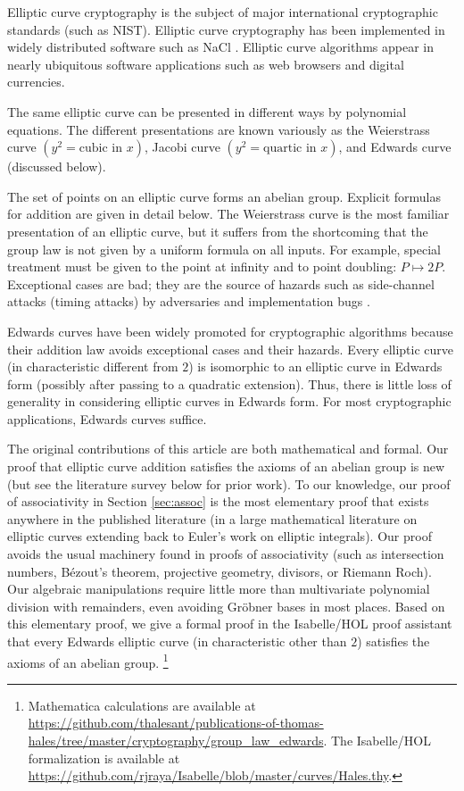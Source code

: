 \documentclass{llncs}
\begin{document}
Elliptic curve cryptography is the subject of major international
cryptographic standards (such as NIST).  Elliptic curve cryptography
has been implemented in widely distributed software such as NaCl
\cite{bernstein2012security}.  Elliptic curve algorithms appear in
nearly ubiquitous software applications such as web browsers and
digital currencies.

The same elliptic curve can be presented in different ways by
polynomial equations.  The different presentations are known variously
as the Weierstrass curve $(y^2 = \text{cubic in } x)$, Jacobi curve
$(y^2 = \text{quartic in } x)$, and Edwards curve (discussed below).

The set of points on an elliptic curve forms an abelian group.  Explicit
formulas for addition are given in detail below.  The Weierstrass
curve is the most familiar presentation of an elliptic curve, but it
suffers from the shortcoming that the group law is not given by a
uniform formula on all inputs.  For example, special treatment must be
given to the point at infinity and to point doubling: $P
\mapsto 2P$.  Exceptional cases are bad; they are the source of 
hazards such as side-channel attacks (timing attacks) by
adversaries and implementation bugs \cite{brier2002weierstrass}.

Edwards curves have been widely promoted for cryptographic algorithms
because their addition law avoids exceptional cases and their hazards.
Every elliptic curve (in characteristic different from $2$) is
isomorphic to an elliptic curve in Edwards form (possibly after
passing to a quadratic extension).  Thus, there is little loss of
generality in considering elliptic curves in Edwards form.  For most
cryptographic applications, Edwards curves suffice.

The original contributions of this article are both mathematical and
formal.  Our proof that elliptic curve addition satisfies the axioms
of an abelian group is new (but see the literature survey below for
prior work).  To our knowledge, our proof of
associativity in Section \ref{sec:assoc} is the most elementary proof
that exists anywhere in the published literature (in a large
mathematical literature on elliptic curves extending back to Euler's
work on elliptic integrals).  Our proof avoids the usual machinery
found in proofs of associativity (such as intersection numbers,
B\'ezout's theorem, projective geometry, divisors, or Riemann Roch).
Our algebraic manipulations require little more than multivariate
polynomial division with remainders, even avoiding Gr\"obner bases
in most places.
Based on this elementary proof, we give a formal proof in the
Isabelle/HOL proof assistant that every Edwards elliptic curve (in
characteristic other than $2$) satisfies the axioms of an abelian
group.%
%
\footnote{Mathematica calculations are available at\\
  \url{https://github.com/thalesant/publications-of-thomas-hales/tree/master/cryptography/group_law_edwards}.
  The Isabelle/HOL formalization is available at\\
  \url{https://github.com/rjraya/Isabelle/blob/master/curves/Hales.thy}.}
\end{document}
